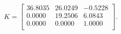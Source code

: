\begin{equation*}
K = 
\begin{bmatrix}
 36.8035 &  26.0249 &  -0.5228 \\
  0.0000 &  19.2506 &   6.0843 \\
  0.0000 &   0.0000 &   1.0000 \\
\end{bmatrix}.
\end{equation*}
